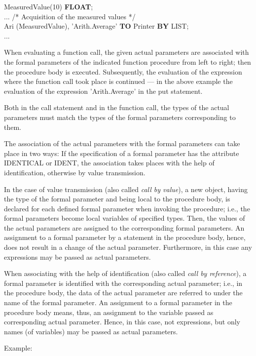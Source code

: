  MeasuredValue(10) {\bf FLOAT};\\
\x ...
\x \x /* Acquisition of the measured values */ \\
 Ari (MeasuredValue), 'Arith.Average' {\bf TO} Printer {\bf BY} LIST;\\
\x ...

When evaluating a function call, the given actual parameters are
associated with the formal parameters of the indicated function
procedure 
from left to right;
 then the procedure body is
executed. Subsequently, the evaluation of the expression where the
function call took place is continued --- in the above example the
evaluation of the expression 'Arith.Average' in the put statement.

Both in the call statement and in the function call, the types of the
actual parameters must match the types of the formal parameters
corresponding to them.

The association of the actual parameters with the formal parameters can
take place in two ways: If the specification of a formal parameter has
the attribute IDENTICAL or IDENT, the association takes places with the
help of identification, otherwise by value transmission.

In the case of value transmission (also called {\em call by value}), a
new object, having the type of the formal parameter and being local to
the procedure body, is declared for each defined formal parameter when
invoking the procedure; i.e., the formal parameters become local
variables of specified types. Then, the values of the actual parameters
are assigned to the corresponding formal parameters. An assignment to a
formal parameter by a statement in the procedure body, hence, does not
result in a change of the actual parameter. Furthermore, in this case
any expressions may be passed as actual parameters.

When associating with the help of identification (also called {\em call
by reference}), a formal parameter is identified with the corresponding
actual parameter; i.e., in the procedure body, the data of the actual
parameter are referred to under the name of the formal parameter. An
assignment to a formal parameter in the procedure body means, thus, an
assignment to the variable passed as corresponding actual parameter.
Hence, in this case, not expressions, but only names (of variables) may
be passed as actual parameters.

Example:

